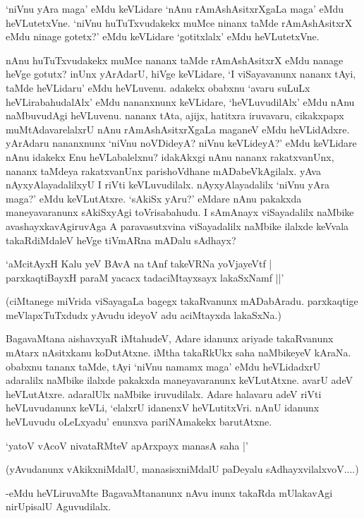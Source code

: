 `niVnu yAra maga' eMdu keVLidare `nAnu rAmAshAsitxrXgaLa maga' eMdu heVLutetxVne. `niVnu huTuTxvudakekx muMce ninanx taMde rAmAshAsitxrX eMdu ninage gotetx?' eMdu keVLidare `gotitxlalx' eMdu heVLutetxVne.

nAnu huTuTxvudakekx muMce nananx taMde rAmAshAsitxrX eMdu nanage heVge gotutx? inUnx yArAdarU, hiVge keVLidare, `I viSayavanunx nananx tAyi, taMde heVLidaru' eMdu heVLuvenu. adakekx obabxnu `avaru suLuLx heVLirabahudalAlx' eMdu nananxnunx keVLidare, `heVLuvudilAlx' eMdu nAnu naMbuvudAgi heVLuvenu. nananx tAta, ajijx, hatitxra iruvavaru, cikakxpapx muMtAdavarelalxrU nAnu rAmAshAsitxrXgaLa maganeV eMdu heVLidAdxre. yArAdaru nananxnunx `niVnu noVDideyA? niVnu keVLideyA?' eMdu keVLidare nAnu idakekx Enu heVLabalelxnu? idakAkxgi nAnu nananx rakatxvanUnx, nananx taMdeya rakatxvanUnx parishoVdhane mADabeVkAgilalx. yAva nAyxyAlayadalilxyU I riVti keVLuvudilalx. nAyxyAlayadalilx `niVnu yAra maga?' eMdu keVLutAtxre. `sAkiSx yAru?' eMdare nAnu pakakxda maneyavaranunx sAkiSxyAgi toVrisabahudu. I sAmAnayx viSayadalilx naMbike avashayxkavAgiruvAga A paravasutxvina viSayadalilx naMbike ilalxde keVvala takaRdiMdaleV heVge tiVmARna mADalu sAdhayx?

\begin{shloka}
`aMcitAyxH Kalu yeV BAvA na tAnf takeVRNa yoVjayeVtf |\\
parxkaqtiBayxH paraM yacacx tadaciMtayxsayx lakaSxNamf ||'
\end{shloka}

(ciMtanege miVrida viSayagaLa bagegx takaRvanunx mADabAradu. parxkaqtige meVlapxTuTxdudx yAvudu ideyoV adu aciMtayxda lakaSxNa.)

BagavaMtana aishavxyaR iMtahudeV, Adare idanunx ariyade takaRvanunx mAtarx nAsitxkanu koDutAtxne. iMtha takaRkUkx saha naMbikeyeV kAraNa. obabxnu tananx taMde, tAyi `niVnu namamx maga' eMdu heVLidadxrU adaralilx naMbike ilalxde pakakxda maneyavaranunx keVLutAtxne. avarU adeV heVLutAtxre. adaralUlx naMbike iruvudilalx. Adare halavaru adeV riVti heVLuvudanunx keVLi, `elalxrU idanenxV heVLutitxVri. nAnU idanunx heVLuvudu oLeLxyadu' enunxva pariNAmakekx barutAtxne.

\begin{shloka}
`yatoV vAcoV nivataRMteV apArxpayx manasA saha |'
\end{shloka}

(yAvudanunx vAkikxniMdalU, manasisxniMdalU paDeyalu sAdhayxvilalxvoV....)

-eMdu heVLiruvaMte BagavaMtananunx nAvu inunx takaRda mUlakavAgi nirUpisalU Aguvudilalx.

